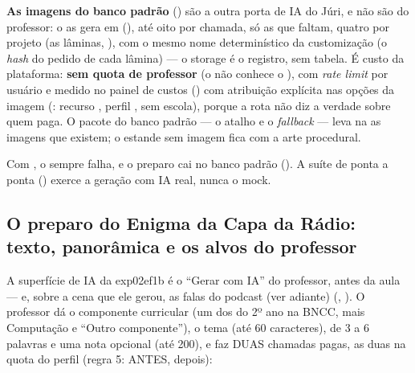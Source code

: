 \textbf{As imagens do banco padrão} () são a outra porta de IA
do Júri, e não são do professor: o  as gera em
 (), até oito por chamada, só as que faltam,
quatro por projeto (as lâminas, ), com o mesmo nome determinístico
da customização (o \emph{hash} do pedido de cada lâmina) --- o storage é o
registro, sem tabela. É custo da
plataforma: \textbf{sem quota de professor} (o  não conhece o
), com \emph{rate limit} por usuário e medido no painel de custos
() com atribuição explícita nas opções da imagem
(: recurso ,
perfil , sem escola), porque a rota não diz a verdade sobre quem
paga. O pacote do banco padrão --- o atalho e o \emph{fallback} --- leva na
 as imagens que existem; o estande sem imagem fica com a arte
procedural.

\begin{atencao}
Com , o  sempre falha, e o
preparo cai no banco padrão (). A suíte de ponta a ponta
() exerce a geração com IA real, nunca o mock.
\end{atencao}

\subsection{O preparo do Enigma da Capa da Rádio: texto, panorâmica e os alvos do professor}
\label{sec:ia-preparo-exp02ef1b}

A superfície de IA da exp02ef1b é o \enquote{Gerar com IA} do
professor, antes da aula --- e, sobre a cena que ele gerou, as falas do
podcast (ver adiante) (,
). O professor dá o componente curricular (um dos do 2º ano na BNCC, mais
Computação e \enquote{Outro componente}), o tema (até 60 caracteres), de 3
a 6 palavras e uma nota opcional (até 200), e  faz DUAS chamadas pagas,
as duas na quota do perfil  (regra 5:  ANTES,
 depois):

